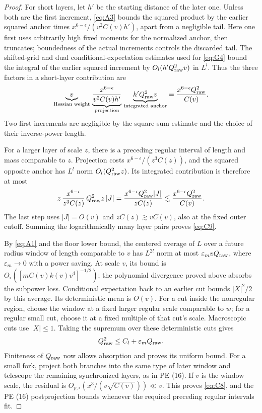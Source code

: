 \begin{proof}
For short layers, let \(h'\) be the starting distance of the later one.
Unless both are the first increment, \eqref{eq:A3} bounds the squared
product by the earlier squared anchor times
\(x^{6-\epsilon}/(v^2C(v)h')\), apart from a negligible tail.
Here one first uses arbitrarily high fixed moments for the normalized
anchor, then truncates; boundedness of the actual increments controls
the discarded tail. The shifted-grid and dual conditional-expectation
estimates used for \eqref{eq:G4} bound the integral of the earlier
squared increment by \(O_l(h'Q_{\rm raw}^2v)\) in \(L^l\).
Thus the three factors in a short-layer contribution are
\[
 \underbrace{v}_{\text{Hessian weight}}\,
 \underbrace{\frac{x^{6-\epsilon}}{v^2C(v)h'}}_{\text{projection}}\,
 \underbrace{h'Q_{\rm raw}^2v}_{\text{integrated anchor}}
 =\frac{x^{6-\epsilon}Q_{\rm raw}^2}{C(v)}.
\]
Two first increments are negligible by the square-sum estimate and the
choice of their inverse-power length.

For a larger layer of scale \(z\), there is a preceding regular
interval of length and mass comparable to \(z\). Projection costs
\(x^{6-\epsilon}/(z^3C(z))\), and the squared opposite anchor has
\(L^l\) norm \(O_l(Q_{\rm raw}^2z)\). Its integrated contribution is
therefore at most
\[
 z\,\frac{x^{6-\epsilon}}{z^3C(z)}\,
 Q_{\rm raw}^2z\,|J|
 =\frac{x^{6-\epsilon}Q_{\rm raw}^2|J|}{zC(z)}
 \lesssim\frac{x^{6-\epsilon}Q_{\rm raw}^2}{C(v)}.
\]
The last step uses \(|J|=O(v)\) and \(zC(z)\gtrsim vC(v)\),
also at the fixed outer cutoff. Summing the logarithmically many layer
pairs proves \eqref{eq:C9}.

By \eqref{eq:A1} and the floor lower bound, the centered average of
\(L\) over a future radius window of length comparable to \(v\)
has \(L^{2l}\) norm at most \(\varepsilon_m vQ_{\rm raw}\), where
\(\varepsilon_m\to0\) with a power saving. At scale \(v\), its bound
is \(O_\circ([mC(v)k(v)v^4]^{-1/2})\); the polynomial divergence
proved above absorbs the subpower loss. Conditional expectation
back to an earlier cut bounds \(|X|^2/2\) by this average. Its
deterministic mean is \(O(v)\). For a cut inside the nonregular region,
choose the window at a fixed larger regular scale comparable to \(w\);
for a regular small cut, choose it at a fixed multiple of that cut's
scale. Macroscopic cuts use \(|X|\le1\). Taking the supremum over
these deterministic cuts gives
\[
 Q_{\rm raw}^2\le C_l+\varepsilon_m Q_{\rm raw}.
\]
Finiteness of \(Q_{\rm raw}\) now allows absorption and proves its
uniform bound. For a small fork, project both branches into the same
type of later window and telescope the remaining synchronized layers,
as in PE (16). If \(v\) is the window scale, the residual is
\(O_{p,\circ}(x^3/(v\sqrt{C(v)}))\ll v\). This proves
\eqref{eq:C8}, and the PE (16) postprojection bounds whenever the
required preceding regular intervals fit.

\end{proof}

